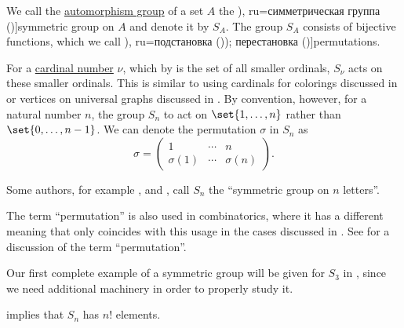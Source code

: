 \begin{definition}\label{def:symmetric_group}
  We call the \hyperref[def:automorphism_group]{automorphism group} of a set \( A \) the \term[bg=симетрична група (\cite[376]{Обрешков1962ВисшаАлгебра}), ru=симметрическая группа (\cite[154]{Винберг2014Алгебра})]{symmetric group} on \( A \) and denote it by \( S_A \). The group \( S_A \) consists of bijective functions, which we call \term[bg=субституция (\cite[80]{ГеновМиховскиМоллов1991Алгебра}), ru=подстановка (\cite[154]{Винберг2014Алгебра})); перестановка (\cite[sec. 4.2]{Тыртышников2007ЛинейнаяАлгебра})]{permutations}.

  For a \hyperref[def:cardinal]{cardinal number} \( \nu \), which by  is the set of all smaller ordinals, \( S_\nu \) acts on these smaller ordinals. This is similar to using cardinals for colorings discussed in  or vertices on universal graphs discussed in . By convention, however, for a natural number \( n \), the group \( S_n \) to act on \( \set{ 1, \ldots, n } \) rather than \( \set{ 0, \ldots, n - 1 } \). We can denote the permutation \( \sigma \) in \( S_n \) as
  \begin{equation*}
    \sigma
    =
    \begin{pmatrix}
      1         & \cdots & n \\
      \sigma(1) & \cdots & \sigma(n)
    \end{pmatrix}.
  \end{equation*}
\end{definition}
\begin{comments}
  \item Some authors, for example ,  and , call \( S_n \) the \enquote{symmetric group on \( n \) letters}.

  \item The term \enquote{permutation} is also used in combinatorics, where it has a different meaning that only coincides with this usage in the cases discussed in . See  for a discussion of the term \enquote{permutation}.

  \item Our first complete example of a symmetric group will be given for \( S_3 \) in , since we need additional machinery in order to properly study it.

  \item {} implies that \( S_n \) has \( n! \) elements.
\end{comments}

